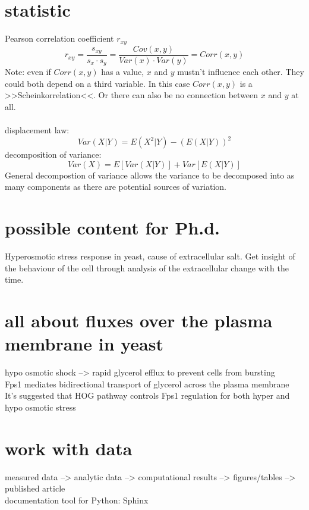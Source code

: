\documentclass[12pt,a4paper,bibliography=totocnumbered]{scrartcl}
\begin{document}
\section{statistic}
Pearson correlation coefficient $r_{xy}$
\begin{equation*}
r_{xy}=\frac{s_{xy}}{s_x \cdot s_y}=\frac{Cov(x,y)}{Var(x)\cdot Var(y)}=Corr(x,y)
\end{equation*}
Note: even if $Corr(x,y)$ has a value, $x$ and $y$ mustn't influence each other. They could both depend on a third variable. In this case $Corr(x,y)$ is a >>Scheinkorrelation<<. Or there can also be no connection between $x$ and $y$ at all.\\\\
displacement law:
\begin{equation*}
	Var(X|Y)=E(X^2|Y)-(E(X|Y))^2
\end{equation*}
decomposition of variance:
\begin{equation*}
Var(X)=E[Var(X|Y)] + Var[E(X|Y)]
\end{equation*}
General decompostion of variance allows the variance to be decomposed into as many components as there are potential sources of variation.

\section{possible content for Ph.d.}
Hyperosmotic stress response in yeast, cause of extracellular salt. Get insight of the behaviour of the cell through analysis of the extracellular change with the time.

\section{all about fluxes over the plasma membrane  in yeast}
hypo osmotic shock --> rapid glycerol efflux to prevent cells from bursting\\
Fps1 mediates bidirectional transport of glycerol across the plasma membrane\\
It's suggested that HOG pathway controls Fps1 regulation for both hyper and hypo osmotic stress

\section{work with data}
measured data --> analytic data --> computational results --> figures/tables --> published article\\
documentation tool for Python: Sphinx
\end{document}
